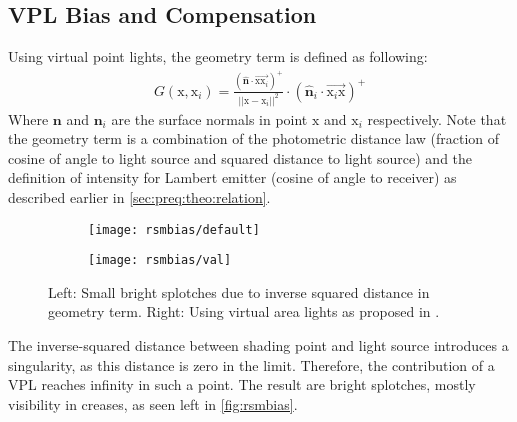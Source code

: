 \documentclass[thesis.tex]{subfiles}
\begin{document}
\subsection{VPL Bias and Compensation}
Using virtual point lights, the geometry term is defined as following:
\begin{align}
G(\mathrm{x}, \mathrm{x}_i) = \frac{(\hat{\mathbf{n}} \cdot \overrightarrow{\mathrm{x}\mathrm{x}_i} )^+}{||\mathrm{x} - \mathrm{x}_i||^2} \cdot (\hat{\mathbf{n}}_i \cdot \overrightarrow{\mathrm{x}_i\mathrm{x}})^+
\end{align}
Where $\mathbf{n}$ and $\mathbf{n}_i$ are the surface normals in point $\mathrm{x}$ and $\mathrm{x}_i$ respectively.
Note that the geometry term is a combination of the photometric distance law (fraction of cosine of angle to light source and squared distance to light source) and the definition of intensity for Lambert emitter (cosine of angle to receiver) as described earlier in \autoref{sec:preq:theo:relation}.
\\
\begin{figure}[h]
\centering
\begin{subfigure}[b]{0.48\textwidth}
	\texttt{[image: rsmbias/default]}
\end{subfigure}
\begin{subfigure}[b]{0.48\textwidth}
	\texttt{[image: rsmbias/val]}
\end{subfigure}
\caption{Left: Small bright splotches due to inverse squared distance in geometry term. Right: Using virtual area lights as proposed in \cite{bib:LightskinPaper}.}\label{fig:rsmbias}
\end{figure}
The inverse-squared distance between shading point and light source introduces a singularity, as this distance is zero in the limit.
Therefore, the contribution of a VPL reaches infinity in such a point.
The result are bright splotches, mostly visibility in creases, as seen left in \autoref{fig:rsmbias}.
\end{document}
